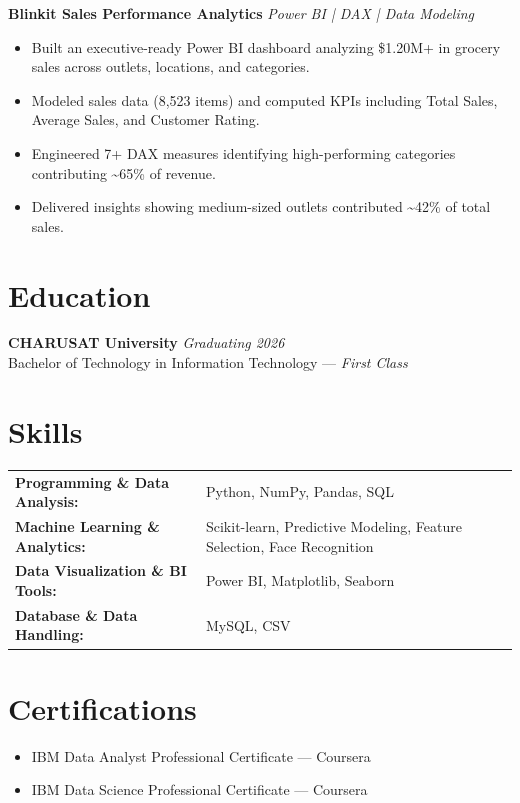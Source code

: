\documentclass[a4paper,9pt]{article}
\begin{document}
\textbf{Blinkit Sales Performance Analytics} \hfill \textit{Power BI | DAX | Data Modeling}
\begin{itemize}
    \item Built an executive-ready Power BI dashboard analyzing \$1.20M+ in grocery sales across outlets, locations, and categories.
    \item Modeled sales data (8,523 items) and computed KPIs including Total Sales, Average Sales, and Customer Rating.
    \item Engineered 7+ DAX measures identifying high-performing categories contributing \textasciitilde65\% of revenue.
    \item Delivered insights showing medium-sized outlets contributed \textasciitilde42\% of total sales.
\end{itemize}

\section{Education}
\textbf{CHARUSAT University} \hfill \textit{Graduating 2026} \\
Bachelor of Technology in Information Technology — \textit{First Class}

\section{Skills}
\begin{tabularx}{\textwidth}{@{}l X@{}}
\textbf{Programming \& Data Analysis:} & Python, NumPy, Pandas, SQL \\
\textbf{Machine Learning \& Analytics:} & Scikit-learn, Predictive Modeling, Feature Selection, Face Recognition \\
\textbf{Data Visualization \& BI Tools:} & Power BI, Matplotlib, Seaborn \\
\textbf{Database \& Data Handling:} & MySQL, CSV \\
\end{tabularx}

\section{Certifications}
\begin{itemize}
    \item IBM Data Analyst Professional Certificate — Coursera
    \item IBM Data Science Professional Certificate — Coursera
\end{itemize}
\end{document}
